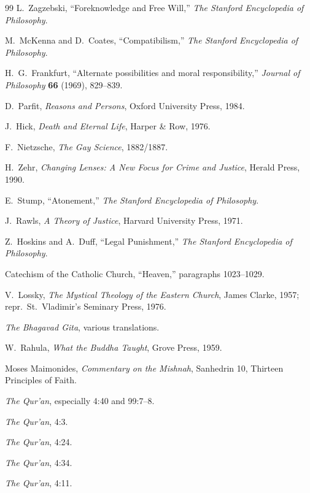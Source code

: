\documentclass[11pt]{article}
\theoremstyle{remark}
\theoremstyle{plain}
\begin{document}
\begin{thebibliography}{99}
L.\ Zagzebski,
``Foreknowledge and Free Will,''
\emph{The Stanford Encyclopedia of Philosophy}.

M.\ McKenna and D.\ Coates,
``Compatibilism,''
\emph{The Stanford Encyclopedia of Philosophy}.

H.\ G.\ Frankfurt,
``Alternate possibilities and moral responsibility,''
\emph{Journal of Philosophy} \textbf{66} (1969), 829--839.

D.\ Parfit,
\emph{Reasons and Persons},
Oxford University Press, 1984.

J.\ Hick,
\emph{Death and Eternal Life},
Harper \& Row, 1976.

F.\ Nietzsche,
\emph{The Gay Science},
1882/1887.

H.\ Zehr,
\emph{Changing Lenses: A New Focus for Crime and Justice},
Herald Press, 1990.

E.\ Stump,
``Atonement,''
\emph{The Stanford Encyclopedia of Philosophy}.

J.\ Rawls,
\emph{A Theory of Justice},
Harvard University Press, 1971.

Z.\ Hoskins and A.\ Duff,
``Legal Punishment,''
\emph{The Stanford Encyclopedia of Philosophy}.

Catechism of the Catholic Church,
``Heaven,'' paragraphs 1023--1029.

V.\ Lossky,
\emph{The Mystical Theology of the Eastern Church},
James Clarke, 1957; repr.\ St.\ Vladimir's Seminary Press, 1976.

\emph{The Bhagavad Gita},
various translations.

W.\ Rahula,
\emph{What the Buddha Taught},
Grove Press, 1959.

Moses Maimonides,
\emph{Commentary on the Mishnah}, Sanhedrin 10, Thirteen Principles of Faith.

\emph{The Qur'an},
especially 4:40 and 99:7--8.

\emph{The Qur'an}, 4:3.

\emph{The Qur'an}, 4:24.

\emph{The Qur'an}, 4:34.

\emph{The Qur'an}, 4:11.


\end{thebibliography}
\end{document}
